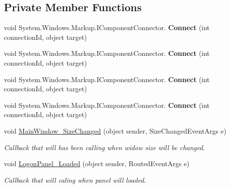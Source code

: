 \subsection*{Private Member Functions}
\begin{DoxyCompactItemize}
\item 
\mbox{\label{class_wpf_handler_1_1_u_i_1_1_controls_1_1_logon_1_1_logon_panel_aadd1d6dc671028b7a54d884bcb40e2c6}} 
void System.\+Windows.\+Markup.\+I\+Component\+Connector. {\bfseries Connect} (int connection\+Id, object target)
\item 
\mbox{\label{class_wpf_handler_1_1_u_i_1_1_controls_1_1_logon_1_1_logon_panel_aadd1d6dc671028b7a54d884bcb40e2c6}} 
void System.\+Windows.\+Markup.\+I\+Component\+Connector. {\bfseries Connect} (int connection\+Id, object target)
\item 
\mbox{\label{class_wpf_handler_1_1_u_i_1_1_controls_1_1_logon_1_1_logon_panel_aadd1d6dc671028b7a54d884bcb40e2c6}} 
void System.\+Windows.\+Markup.\+I\+Component\+Connector. {\bfseries Connect} (int connection\+Id, object target)
\item 
\mbox{\label{class_wpf_handler_1_1_u_i_1_1_controls_1_1_logon_1_1_logon_panel_aadd1d6dc671028b7a54d884bcb40e2c6}} 
void System.\+Windows.\+Markup.\+I\+Component\+Connector. {\bfseries Connect} (int connection\+Id, object target)
\item 
void \mbox{\hyperlink{class_wpf_handler_1_1_u_i_1_1_controls_1_1_logon_1_1_logon_panel_a4f72805700420f21360f6d5ffa5c57e0}{Main\+Window\+\_\+\+Size\+Changed}} (object sender, Size\+Changed\+Event\+Args e)
\begin{DoxyCompactList}\small\item\em Callback that will has been calling when widow size will be changed. \end{DoxyCompactList}\item 
void \mbox{\hyperlink{class_wpf_handler_1_1_u_i_1_1_controls_1_1_logon_1_1_logon_panel_a15ae3f2fcfd57772403ee512f9b9b649}{Logon\+Panel\+\_\+\+Loaded}} (object sender, Routed\+Event\+Args e)
\begin{DoxyCompactList}\small\item\em Callback that will caling when panel will loaded. \end{DoxyCompactList}\item 

\end{DoxyCompactItemize}
